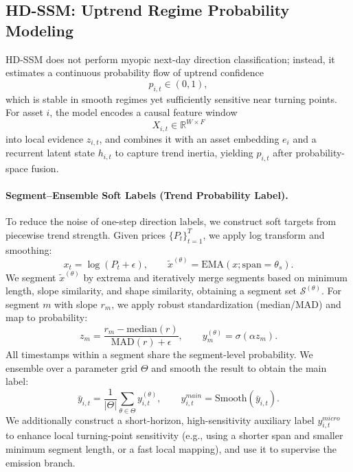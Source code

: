 \documentclass[letterpaper]{article} %
\begin{document}
\subsection{HD-SSM: Uptrend Regime Probability Modeling}
\label{sec:overall}
HD-SSM does not perform myopic next-day direction classification; instead, it estimates a continuous probability
flow of uptrend confidence
\begin{equation}
p_{i,t}\in(0,1),
\end{equation}
which is stable in smooth regimes yet sufficiently sensitive near turning points.
For asset $i$, the model encodes a causal feature window
\begin{equation}
X_{i,t}\in\mathbb{R}^{W\times F}
\end{equation}
into local evidence $z_{i,t}$, and combines it with an asset embedding $e_i$ and a recurrent latent state $h_{i,t}$
to capture trend inertia, yielding $p_{i,t}$ after probability-space fusion.

\paragraph{Segment--Ensemble Soft Labels (Trend Probability Label).}
To reduce the noise of one-step direction labels, we construct soft targets from piecewise trend strength.
Given prices $\{P_t\}_{t=1}^T$, we apply log transform and smoothing:
\begin{equation}
x_t=\log(P_t+\epsilon),\qquad \tilde x^{(\theta)}=\mathrm{EMA}(x;\mathrm{span}=\theta_s).
\end{equation}
We segment $\tilde x^{(\theta)}$ by extrema and iteratively merge segments based on minimum length, slope similarity,
and shape similarity, obtaining a segment set $\mathcal S^{(\theta)}$.
For segment $m$ with slope $r_m$, we apply robust standardization (median/MAD) and map to probability:
\begin{equation}
z_m=\frac{r_m-\mathrm{median}(r)}{\mathrm{MAD}(r)+\epsilon},\qquad
y_m^{(\theta)}=\sigma(\alpha z_m).
\end{equation}
All timestamps within a segment share the segment-level probability. We ensemble over a parameter grid $\Theta$
and smooth the result to obtain the main label:
\begin{equation}
\bar y_{i,t}=\frac{1}{|\Theta|}\sum_{\theta\in\Theta} y^{(\theta)}_{i,t},\qquad
y^{main}_{i,t}=\mathrm{Smooth}(\bar y_{i,t}).
\end{equation}
We additionally construct a short-horizon, high-sensitivity auxiliary label $y^{micro}_{i,t}$ to enhance local
turning-point sensitivity (e.g., using a shorter span and smaller minimum segment length, or a fast local mapping),
and use it to supervise the emission branch.
\end{document}
